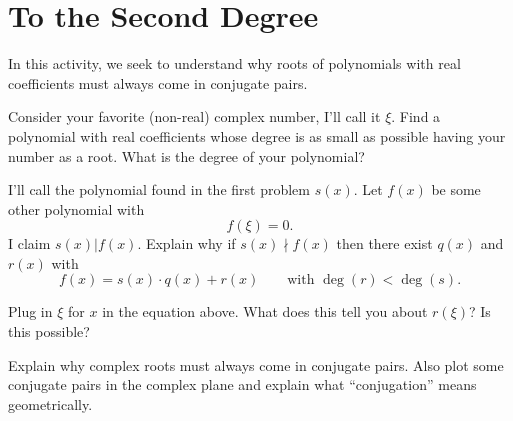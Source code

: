 \newpage
\section{To the Second Degree}\label{A:deg2Ext}

In this activity, we seek to understand why roots of polynomials with
real coefficients must always come in conjugate pairs.

\begin{prob}
Consider your favorite (non-real) complex number, I'll call it
$\xi$. Find a polynomial with real coefficients whose degree is as
small as possible having your number as a root. What is the degree
of your polynomial?
\end{prob}


\begin{prob}
I'll call the polynomial found in the first problem $s(x)$. Let $f(x)$
be some other polynomial with
\[
f(\xi) = 0.
\]
I claim $s(x) | f(x)$. Explain why if $s(x)\nmid f(x)$ then there exist $q(x)$ and $r(x)$ with
\[
f(x) = s(x) \cdot q(x) + r(x)\qquad\text{with }\deg(r) <\deg(s).
\]
\end{prob}

\begin{prob}
Plug in $\xi$ for $x$ in the equation above. What does this tell you
about $r(\xi)$? Is this possible?
\end{prob}

\begin{prob}
Explain why complex roots must always come in conjugate pairs. Also
plot some conjugate pairs in the complex plane and explain what
``conjugation'' means geometrically.
\end{prob}
